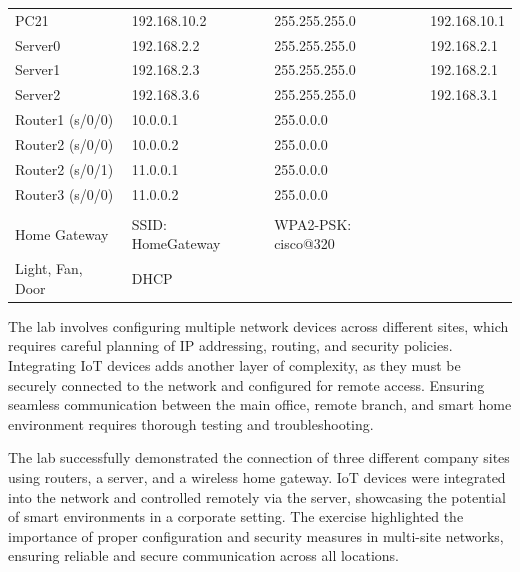 \begin{tabularx}{\textwidth}{XXXX}
   PC21 & 192.168.10.2 & 255.255.255.0 & 192.168.10.1\\
   
   Server0 & 192.168.2.2 & 255.255.255.0 & 192.168.2.1\\
   Server1 & 192.168.2.3 & 255.255.255.0 & 192.168.2.1\\
   Server2 & 192.168.3.6 & 255.255.255.0 & 192.168.3.1\\

   
   Router1 (s/0/0) & 10.0.0.1 & 255.0.0.0\\
   Router2 (s/0/0) & 10.0.0.2 & 255.0.0.0\\
   Router2 (s/0/1) & 11.0.0.1 & 255.0.0.0\\
   Router3 (s/0/0) & 11.0.0.2 & 255.0.0.0\\\\

   Home Gateway & SSID: HomeGateway & WPA2-PSK: cisco@320 \\
   Light, Fan, Door & DHCP
\end{tabularx}



\pagebreak
{}
The lab involves configuring multiple network devices across different sites, which requires careful planning of IP addressing, routing, and security policies. Integrating IoT devices adds another layer of complexity, as they must be securely connected to the network and configured for remote access. Ensuring seamless communication between the main office, remote branch, and smart home environment requires thorough testing and troubleshooting.

The lab successfully demonstrated the connection of three different company sites using routers, a server, and a wireless home gateway. IoT devices were integrated into the network and controlled remotely via the server, showcasing the potential of smart environments in a corporate setting. The exercise highlighted the importance of proper configuration and security measures in multi-site networks, ensuring reliable and secure communication across all locations.